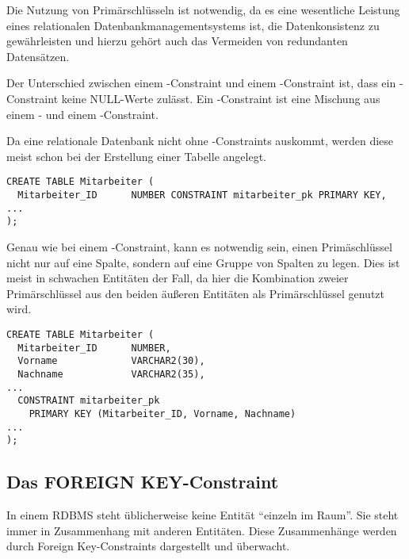         Die Nutzung von Primärschlüsseln ist notwendig, da es eine wesentliche Leistung eines relationalen Datenbankmanagementsystems ist, die Datenkonsistenz zu gewährleisten und hierzu gehört auch das Vermeiden von redundanten Datensätzen.

        \begin{merke}
          Der Unterschied zwischen einem \UNIQUE-Constraint und einem \PRIMARYKEY-Constraint ist, dass ein \PRIMARYKEY-Constraint keine NULL-Werte zulässt. Ein \PRIMARYKEY-Constraint ist eine Mischung aus einem \NOTNULL- und einem \UNIQUE-Constraint.
        \end{merke}
        Da eine relationale Datenbank nicht ohne \PRIMARYKEY-Constraints
        auskommt, werden diese meist schon bei der Erstellung einer Tabelle
        angelegt.
\clearpage
        \begin{lstlisting}[language=oracle_sql,caption={Ein PRIMARY KEY-Constraint als Inline Constraint anlegen},label=sql09_13]
CREATE TABLE Mitarbeiter (
  Mitarbeiter_ID      NUMBER CONSTRAINT mitarbeiter_pk PRIMARY KEY,
...
);
        \end{lstlisting}
        Genau wie bei einem \UNIQUE-Constraint, kann es notwendig sein, einen Primäschlüssel nicht nur auf eine Spalte, sondern auf eine Gruppe von Spalten zu legen. Dies ist meist in schwachen Entitäten der Fall, da hier die Kombination zweier Primärschlüssel aus den beiden äußeren Entitäten als Primärschlüssel genutzt wird.
        \begin{lstlisting}[language=oracle_sql,caption={Ein PRIMARY KEY-Constraint als Out Of Line Constraint auf mehrere Spalten anlegen},label=sql09_14]
CREATE TABLE Mitarbeiter (
  Mitarbeiter_ID      NUMBER,
  Vorname             VARCHAR2(30),
  Nachname            VARCHAR2(35),
...
  CONSTRAINT mitarbeiter_pk
    PRIMARY KEY (Mitarbeiter_ID, Vorname, Nachname)
...
);
        \end{lstlisting}
      \subsection{Das FOREIGN KEY-Constraint}
        \label{refint}
        In einem RDBMS steht üblicherweise keine Entität \enquote{einzeln im Raum}. Sie steht immer in Zusammenhang mit anderen Entitäten. Diese Zusammenhänge werden durch Foreign Key-Constraints dargestellt und überwacht.

